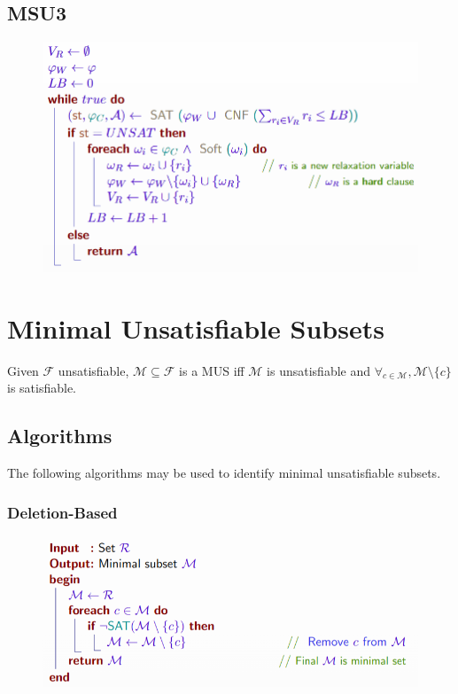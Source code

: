 \documentclass[10pt,a4paper]{report}
\begin{document}
\subsection{MSU3}
\begin{figure}[H]
    \centering
    \includegraphics[scale=0.5]{11.png}
\end{figure}

\section{Minimal Unsatisfiable Subsets}
Given $\mathcal{F}$ unsatisfiable, $\mathcal{M} \subseteq \mathcal{F}$ is a MUS iff $\mathcal{M}$ is unsatisfiable and $\forall_{c \in \mathcal{M}}, \mathcal{M} \setminus \{c\}$ is satisfiable.
\subsection{Algorithms}
The following algorithms may be used to identify minimal unsatisfiable subsets.
\subsubsection{Deletion-Based}
\begin{figure}[H]
    \centering
    \includegraphics[scale=0.5]{12.png}
\end{figure}
\end{document}

